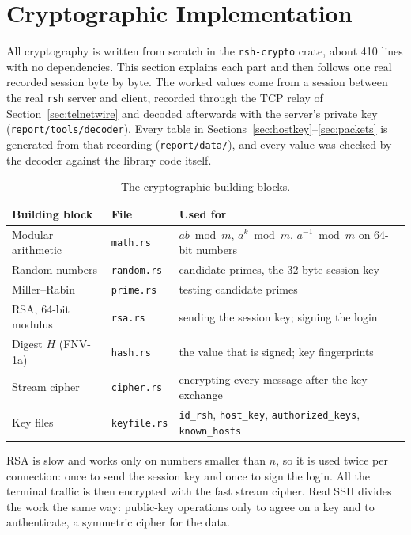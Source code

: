 \section{Cryptographic Implementation}
\label{sec:crypto}

All cryptography is written from scratch in the \texttt{rsh-crypto} crate,
about 410 lines with no dependencies. This section explains each part and then
follows one real recorded session byte by byte. The worked values come from a
session between the real \texttt{rsh} server and client, recorded through the
TCP relay of Section~\ref{sec:telnetwire} and decoded afterwards with the
server's private key (\texttt{report/tools/decoder}). Every table in
Sections~\ref{sec:hostkey}--\ref{sec:packets} is generated from that recording
(\texttt{report/data/}), and every value was checked by the decoder against the
library code itself.

\begin{table}[H]
\centering
\footnotesize
\begin{tabularx}{\textwidth}{@{}l l X@{}}
\toprule
Building block & File & Used for \\
\midrule
Modular arithmetic & \texttt{math.rs} & $a b \bmod m$, $a^{k} \bmod m$, $a^{-1} \bmod m$ on 64-bit numbers \\
Random numbers & \texttt{random.rs} & candidate primes, the 32-byte session key \\
Miller--Rabin & \texttt{prime.rs} & testing candidate primes \\
RSA, 64-bit modulus & \texttt{rsa.rs} & sending the session key; signing the login \\
Digest $H$ (FNV-1a) & \texttt{hash.rs} & the value that is signed; key fingerprints \\
Stream cipher & \texttt{cipher.rs} & encrypting every message after the key exchange \\
Key files & \texttt{keyfile.rs} & \texttt{id\_rsh}, \texttt{host\_key}, \texttt{authorized\_keys}, \texttt{known\_hosts} \\
\bottomrule
\end{tabularx}
\caption{The cryptographic building blocks.}
\end{table}

RSA is slow and works only on numbers smaller than $n$, so it is used twice per
connection: once to send the session key and once to sign the login. All the
terminal traffic is then encrypted with the fast stream cipher. Real SSH divides
the work the same way: public-key operations only to agree on a key and to
authenticate, a symmetric cipher for the data.

